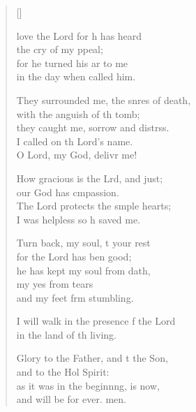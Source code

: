 \settowidth{\versewidth}{They surrounded me, the snares of death, *}
\begin{verse}[\versewidth]
  \begin{patverse}
 love the Lord for h has heard\Med\\
the cry of my ppeal;\\
for he turned his ar to me\Med\\
in the day when  called him.

They surrounded me, the snres of death,\Med\\
with the anguish of th tomb;\\
they caught me, sorrow and distrss.\Flex\\
I called on th Lord’s name.\Med\\
O Lord, my God, delivr me!

How gracious is the Lrd, and just;\Med\\
our God has cmpassion.\\
The Lord protects the s\pointup{\i}mple hearts;\Med\\
I was helpless so h saved me.

Turn back, my soul, t your rest\Med\\
for the Lord has ben good;\\
he has kept my soul from dath,\Flex\\
my yes from tears\Med\\
and my feet frm stumbling.

I will walk in the presence f the Lord\Med\\
in the land of th living.

Glory to the Father, and t the Son,\Med\\
and to the Hol Spirit:\\
as it was in the beginn\pointup{\i}ng, is now,\Med\\
and will be for ever. men.
  \end{patverse}
\end{verse}
